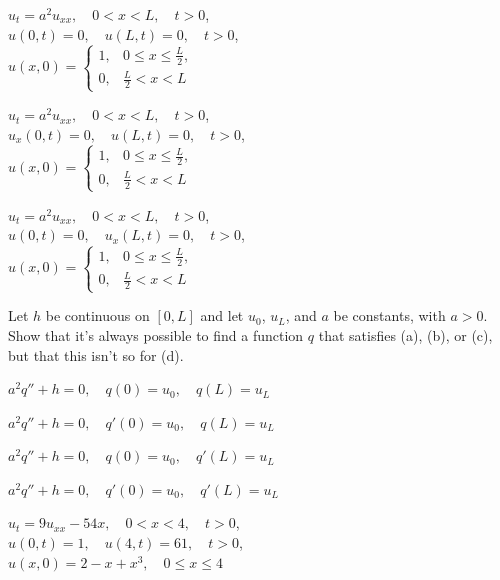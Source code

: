 \begin{exerciselist}
\item\label{exer:12.1.44}\Cex
$u_t=a^2u_{xx},\quad 0<x<L,\quad t>0$,\\
$u(0,t)=0,\quad u(L,t)=0,\quad t>0$,\\
$u(x,0)=
\begin{cases}
1,&0\le x\le\frac{L}{2},\\0,&\frac{L}{2}<x<L
\end{cases}$

\item\label{exer:12.1.45}\Cex
$u_t=a^2u_{xx},\quad 0<x<L,\quad t>0$,\\
$u_x(0,t)=0,\quad u(L,t)=0,\quad t>0$,\\
$u(x,0)=
\begin{cases}
1,&0\le x\le\frac{L}{2},\\0,&\frac{L}{2}<x<L
\end{cases}$

\item\label{exer:12.1.46}\Cex
$u_t=a^2u_{xx},\quad 0<x<L,\quad t>0$,\\
$u(0,t)=0,\quad u_x(L,t)=0,\quad t>0$,\\
$u(x,0)=
\begin{cases}
1,&0\le x\le\frac{L}{2},\\0,&\frac{L}{2}<x<L
\end{cases}$

\item\label{exer:12.1.47}Let $h$ be continuous on $[0,L]$ and let $u_0$, $u_L$, and $a$ be
constants, with $a>0$. Show that it's always possible
to find a function $q$ that satisfies  (a), (b),
or (c), but that this isn't  so for (d).
\begin{alist}
\item %
$a^2q''+h=0,\quad q(0)=u_0,\quad q(L)=u_L$
\item %
$a^2q''+h=0,\quad q'(0)=u_0,\quad q(L)=u_L$
\item %
$a^2q''+h=0,\quad q(0)=u_0,\quad q'(L)=u_L$
\item %
$a^2q''+h=0,\quad q'(0)=u_0,\quad q'(L)=u_L$
\end{alist}


\item\label{exer:12.1.48}$u_t=9u_{xx}-54x,\quad 0<x<4,\quad t>0$,\\
$u(0,t)=1,\quad u(4,t)=61,\quad t>0$,\\ $u(x,0)=2-x+x^3,\quad 0\le
x\le 4$



\end{exerciselist}
